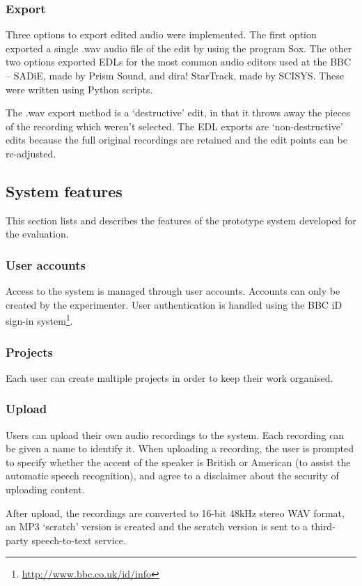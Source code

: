 \subsubsection{Export}
Three options to export edited audio were implemented. The first option
exported a single .wav audio file of the edit by using the program Sox. The
other two options exported EDLs for the most common audio editors used at the
BBC -- SADiE, made by Prism Sound, and dira! StarTrack, made by SCISYS. These
were written using Python scripts.

The .wav export method is a `destructive' edit, in that it throws away the
pieces of the recording which weren't selected. The EDL exports are
`non-destructive' edits because the full original recordings are retained and
the edit points can be re-adjusted.

\subsection{System features}
This section lists and describes the features of the prototype system developed
for the evaluation.

\subsubsection{User accounts}
Access to the system is managed through user accounts. Accounts can only be
created by the experimenter. User authentication is handled using the BBC iD
sign-in system\footnote{\url{http://www.bbc.co.uk/id/info}}.

\subsubsection{Projects}
Each user can create multiple projects in order to keep their work organised.

\subsubsection{Upload}
Users can upload their own audio recordings to the system.  Each recording can
be given a name to identify it. When uploading a recording, the user is
prompted to specify whether the accent of the speaker is British or American
(to assist the automatic speech recognition), and agree to a disclaimer about
the security of uploading content.

After upload, the recordings are converted to 16-bit 48kHz stereo WAV format,
an MP3 `scratch' version is created and the scratch version is sent to a
third-party speech-to-text service.

